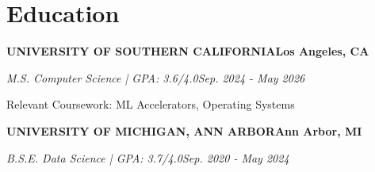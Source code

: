 \documentclass[10pt]{article}
\renewcommand{\note}[1]{#1\par}
\newcommand{\school}[4]{%
  \vspace{2pt}%
  \textbf{\MakeUppercase{#1}}\hfill\textbf{#2}\par
  \vspace{0.5pt}%
  \textit{#3}\hfill\textit{#4}\par
}
\begin{document}
\section{Education}
\vspace{-2pt}
\school{University of Southern California}{Los Angeles, CA}{M.S. Computer Science | GPA: 3.6/4.0}{Sep. 2024 - May 2026}
\note{Relevant Coursework: ML Accelerators, Operating Systems}

\school{University of Michigan, Ann Arbor}{Ann Arbor, MI}{B.S.E. Data Science | GPA: 3.7/4.0}{Sep. 2020 - May 2024}
\end{document}

